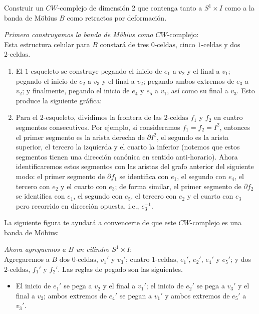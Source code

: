 \begin{ejer}
Construir un $CW\text{-complejo}$ de dimensión 2 que contenga tanto a $S^1 \times I$ como a la banda de Möbius $B$ como retractos por deformación. 
\end{ejer}
\begin{sol}
\emph{Primero construyamos la banda de Möbius como $CW\text{-complejo}$}:\\
Esta estructura celular para $B$ constará de tres $0\text{-celdas}$, cinco $1\text{-celdas}$ y dos $2\text{-celdas}$.
\begin{enumerate}
\item El $1\text{-esqueleto}$ se construye pegando el inicio de $e_1$ a $v_2$ y el final a $v_1$; pegando el inicio de $e_2$ a $v_3$ y el final a $v_2$; pegando ambos extremos de $e_3$ a $v_2$; y finalmente, pegando el inicio de $e_4$ y $e_5$ a $v_1$, así como su final a $v_3$. Esto produce la siguiente gráfica:\par


\item Para el $2\text{-esqueleto}$, dividimos la frontera de las $2\text{-celdas}$ $f_1$ y $f_2$ en cuatro segmentos consecutivos. Por ejemplo, si consideramos $f_1 = f_2 = I^2$, entonces el primer segmento es la arista derecha de $\partial I^2$, el segundo es la arista superior, el tercero la izquierda y el cuarto la inferior (notemos que estos segmentos tienen una dirección canónica en sentido anti-horario). Ahora identificaremos estos segmentos con las aristas del grafo anterior del siguiente modo: el primer segmento de $\partial f_1$ se identifica con $e_1$, el segundo con $e_4$, el tercero con $e_2$ y el cuarto con $e_3$; de forma similar, el primer segmento de $\partial f_2$ se identifica con $e_1$, el segundo con $e_5$, el tercero con $e_2$ y el cuarto con $e_3$ pero recorrido en dirección opuesta, i.e., $e_3^{-1}$. 
\end{enumerate}
La siguiente figura te ayudará a convencerte de que este $CW\text{-complejo}$ es una banda de Möbius:\par\vspace{1em}

\pagebreak[3]
\emph{Ahora agreguemos a $B$ un cilindro $S^1 \times I$}:\\
Agregaremos a $B$ dos $0\text{-celdas}$, $v_1'$ y $v_3'$; cuatro $1\text{-celdas}$, $e_1'$, $e_2'$, $e_4'$ y $e_5'$; y dos $2\text{-celdas}$, $f_1'$ y $f_2'$. Las reglas de pegado son las siguientes.
\begin{itemize}
\item El inicio de $e_1'$ se pega a $v_2$ y el final a $v_1'$; el inicio de $e_2'$ se pega a $v_3'$ y el final a $v_2$; ambos extremos de $e_4'$ se pegan a $v_1'$ y ambos extremos de $e_5'$ a $v_3'$.


\end{itemize}
\end{sol}
